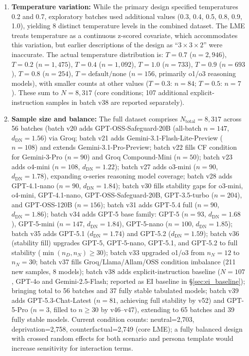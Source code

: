 \documentclass[conference,10pt]{IEEEtran}
\begin{document}
\begin{enumerate}
  \item \textbf{Temperature variation:} While the primary design specified temperatures 0.2 and 0.7, exploratory batches used additional values (0.3, 0.4, 0.5, 0.8, 0.9, 1.0), yielding 8 distinct temperature levels in the combined dataset. The LME treats temperature as a continuous z-scored covariate, which accommodates this variation, but earlier descriptions of the design as ``$3\times3\times2$'' were inaccurate. The actual temperature distribution is: $T=0.7$ ($n=2{,}946$), $T=0.2$ ($n=1{,}475$), $T=0.4$ ($n=1{,}092$), $T=1.0$ ($n=733$), $T=0.9$ ($n=693$), $T=0.8$ ($n=254$), $T=\text{default/none}$ ($n=156$, primarily o1/o3 reasoning models), with smaller counts at other values ($T=0.3$: $n=84$; $T=0.5$: $n=7$). These sum to $N=8{,}317$ (core conditions; 107 additional explicit-instruction samples in batch v38 are reported separately).
  \item \textbf{Sample size and balance:} The full dataset comprises $N_\text{total}=8{,}317$ across 56 batches (batch v20 adds GPT-OSS-Safeguard-20B (all-batch $n=147$, $d_\text{DN}=1.56$) via Groq; batch v21 adds Gemini-3.1-Flash-Lite-Preview ($n=108$) and extends Gemini-3.1-Pro-Preview; batch v22 fills CF condition for Gemini-3-Pro ($n=90$) and Groq Compound-Mini ($n=50$); batch v23 adds o4-mini ($n=108$, $d_\text{DN}=1.22$); batch v27 adds o3-mini ($n=90$, $d_\text{DN}=1.78$), expanding o-series reasoning model coverage; batch v28 adds GPT-4.1-nano ($n=90$, $d_\text{DN}=1.84$); batch v30 fills stability gaps for o3-mini, o4-mini, GPT-4.1-nano, GPT-OSS-Safeguard-20B, GPT-3.5-turbo ($n=204$), and GPT-OSS-120B ($n=156$); batch v31 adds GPT-5.4 full ($n=90$, $d_\text{DN}=1.86$); batch v34 adds GPT-5 base family: GPT-5 ($n=93$, $d_\text{DN}=1.68$), GPT-5-mini ($n=147$, $d_\text{DN}=1.84$), GPT-5-nano ($n=100$, $d_\text{DN}=1.85$); batch v35 adds GPT-5.1 ($d_\text{DN}=1.74$) and GPT-5.2 ($d_\text{DN}=1.59$); batch v36 (stability fill) upgrades GPT-5, GPT-5-nano, GPT-5.1, and GPT-5.2 to full stability ($\min(n_D,n_N)\geq30$); batch v33 upgraded o1/o3 from $n_N=12$ to $n_N=30$; batch v37 fills Groq/Llama/Allam/OSS condition imbalance (211 new samples, 8 models); batch v38 adds explicit-instruction baseline ($N=107$, GPT-4o and Gemini-2.5-Flash; reported as EI baseline in \S\ref{sec:ei_baseline}); bringing total to 56 batches and 37 fully stable tabulated models; batch v39 adds GPT-5.3-Chat-Latest ($n=81$, achieving full stability by v52) and GPT-5-Pro ($n=3$, filled to $n\geq30$ by v46--v47), extending to 65 batches and 39 fully stable models. Current condition counts: neutral=2,703, deprivation=2,758, counterfactual=2,749 (core LME); a fully balanced design with crossed random effects for both scenario and persona template would increase sensitivity for interaction terms.

\end{enumerate}
\end{document}

